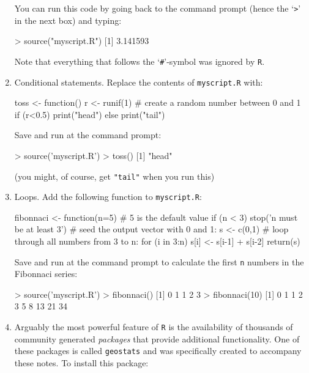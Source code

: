 \begin{enumerate}
You can run this code by going back to the command prompt (hence the
`\verb|>|' in the next box) and typing:

\begin{console}
> source("myscript.R")
[1] 3.141593
\end{console}

Note that everything that follows the `\verb|#|'-symbol was ignored by
\texttt{R}.

\item Conditional statements. Replace the contents of
  \texttt{myscript.R} with:

\begin{script}
toss <- function(){
    r <- runif(1) # create a random number between 0 and 1
    if (r<0.5){
        print("head")
    } else {
        print("tail")
    }
}
\end{script}

Save and run at the command prompt:

\begin{console}
> source('myscript.R')
> toss()
[1] "head"
\end{console}

(you might, of course, get \texttt{"tail"} when you run this)

\item Loops. Add the following function to \texttt{myscript.R}:

\begin{script}
fibonnaci <- function(n=5){ # 5 is the default value
    if (n < 3) { stop('n must be at least 3') }
    # seed the output vector with 0 and 1:
    s <- c(0,1)
    # loop through all numbers from 3 to n:
    for (i in 3:n){
        s[i] <- s[i-1] + s[i-2]
    }
    return(s)
}
\end{script}

Save and run at the command prompt to calculate the first \texttt{n}
numbers in the Fibonnaci series:

\begin{console}
> source('myscript.R')
> fibonnaci()
 [1] 0 1 1 2 3
> fibonnaci(10)
 [1]  0  1  1  2  3  5  8 13 21 34
\end{console}

\item\label{it:geostats} Arguably the most powerful feature of
  \texttt{R} is the availability of thousands of community generated
  \textit{packages} that provide additional functionality. One of
  these packages is called \texttt{geostats} and was specifically
  created to accompany these notes.  To install this package:


\end{enumerate}

